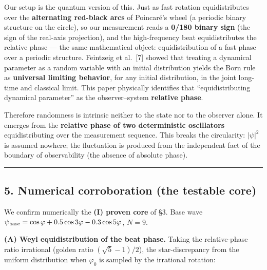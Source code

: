 \documentclass[
]{ltjsarticle}
\begin{document}
Our setup is the quantum version of this. Just as fast rotation
equidistributes over the \textbf{alternating red-black arcs} of
Poincaré's wheel (a periodic binary structure on the circle), so our
measurement reads a \textbf{0/180 binary sign} (the sign of the
real-axis projection), and the high-frequency beat equidistributes the
relative phase --- the same mathematical object: equidistribution of a
fast phase over a periodic structure. Feintzeig et al.~{[}7{]} showed
that treating a dynamical parameter as a random variable with an initial
distribution yields the Born rule as \textbf{universal limiting
behavior}, for any initial distribution, in the joint long-time and
classical limit. This paper physically identifies that
``equidistributing dynamical parameter'' as the observer--system
\textbf{relative phase}.

Therefore randomness is intrinsic neither to the state nor to the
observer alone. It emerges from the \textbf{relative phase of two
deterministic oscillators} equidistributing over the measurement
sequence. This breaks the circularity: \(|\psi|^2\) is assumed nowhere;
the fluctuation is produced from the independent fact of the boundary of
observability (the absence of absolute phase).

\begin{center}\rule{0.5\linewidth}{0.5pt}\end{center}

\subsection{5. Numerical corroboration (the testable
core)}\label{numerical-corroboration-the-testable-core}

We confirm numerically the \textbf{(I) proven core} of §3. Base wave
\(\psi_{\rm base}=\cos\varphi+0.5\cos3\varphi-0.3\cos5\varphi\),
\(N=9\).

\textbf{(A) Weyl equidistribution of the beat phase.} Taking the
relative-phase ratio irrational (golden ratio \((\sqrt5-1)/2\)), the
star-discrepancy from the uniform distribution when \(\varphi_0\) is
sampled by the irrational rotation:
\end{document}
